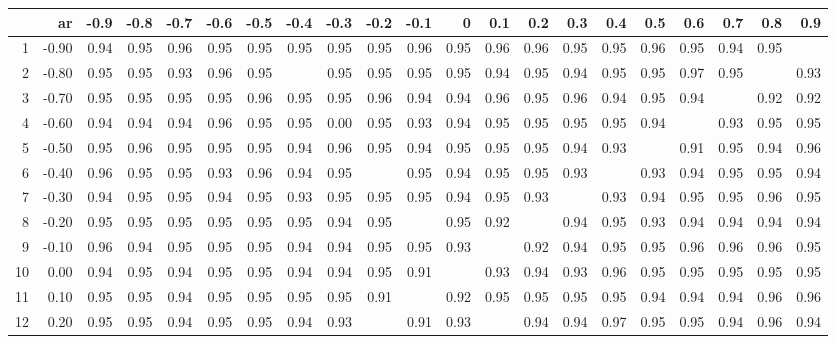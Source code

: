 \begin{table}[ht]
\centering
\begin{tabular}{rrrrrrrrrrrrrrrrrrrrr}
  \hline
 & ar & -0.9 & -0.8 & -0.7 & -0.6 & -0.5 & -0.4 & -0.3 & -0.2 & -0.1 & 0 & 0.1 & 0.2 & 0.3 & 0.4 & 0.5 & 0.6 & 0.7 & 0.8 & 0.9 \\ 
  \hline
1 & -0.90 & 0.94 & 0.95 & 0.96 & 0.95 & 0.95 & 0.95 & 0.95 & 0.95 & 0.96 & 0.95 & 0.96 & 0.96 & 0.95 & 0.95 & 0.96 & 0.95 & 0.94 & 0.95 &  \\ 
  2 & -0.80 & 0.95 & 0.95 & 0.93 & 0.96 & 0.95 &  & 0.95 & 0.95 & 0.95 & 0.95 & 0.94 & 0.95 & 0.94 & 0.95 & 0.95 & 0.97 & 0.95 &  & 0.93 \\ 
  3 & -0.70 & 0.95 & 0.95 & 0.95 & 0.95 & 0.96 & 0.95 & 0.95 & 0.96 & 0.94 & 0.94 & 0.96 & 0.95 & 0.96 & 0.94 & 0.95 & 0.94 &  & 0.92 & 0.92 \\ 
  4 & -0.60 & 0.94 & 0.94 & 0.94 & 0.96 & 0.95 & 0.95 & 0.00 & 0.95 & 0.93 & 0.94 & 0.95 & 0.95 & 0.95 & 0.95 & 0.94 &  & 0.93 & 0.95 & 0.95 \\ 
  5 & -0.50 & 0.95 & 0.96 & 0.95 & 0.95 & 0.95 & 0.94 & 0.96 & 0.95 & 0.94 & 0.95 & 0.95 & 0.95 & 0.94 & 0.93 &  & 0.91 & 0.95 & 0.94 & 0.96 \\ 
  6 & -0.40 & 0.96 & 0.95 & 0.95 & 0.93 & 0.96 & 0.94 & 0.95 &  & 0.95 & 0.94 & 0.95 & 0.95 & 0.93 &  & 0.93 & 0.94 & 0.95 & 0.95 & 0.94 \\ 
  7 & -0.30 & 0.94 & 0.95 & 0.95 & 0.94 & 0.95 & 0.93 & 0.95 & 0.95 & 0.95 & 0.94 & 0.95 & 0.93 &  & 0.93 & 0.94 & 0.95 & 0.95 & 0.96 & 0.95 \\ 
  8 & -0.20 & 0.95 & 0.95 & 0.95 & 0.95 & 0.95 & 0.95 & 0.94 & 0.95 &  & 0.95 & 0.92 &  & 0.94 & 0.95 & 0.93 & 0.94 & 0.94 & 0.94 & 0.94 \\ 
  9 & -0.10 & 0.96 & 0.94 & 0.95 & 0.95 & 0.95 & 0.94 & 0.94 & 0.95 & 0.95 & 0.93 &  & 0.92 & 0.94 & 0.95 & 0.95 & 0.96 & 0.96 & 0.96 & 0.95 \\ 
  10 & 0.00 & 0.94 & 0.95 & 0.94 & 0.95 & 0.95 & 0.94 & 0.94 & 0.95 & 0.91 &  & 0.93 & 0.94 & 0.93 & 0.96 & 0.95 & 0.95 & 0.95 & 0.95 & 0.95 \\ 
  11 & 0.10 & 0.95 & 0.95 & 0.94 & 0.95 & 0.95 & 0.95 & 0.95 & 0.91 &  & 0.92 & 0.95 & 0.95 & 0.95 & 0.95 & 0.94 & 0.94 & 0.94 & 0.96 & 0.96 \\ 
  12 & 0.20 & 0.95 & 0.95 & 0.94 & 0.95 & 0.95 & 0.94 & 0.93 &  & 0.91 & 0.93 &  & 0.94 & 0.94 & 0.97 & 0.95 & 0.95 & 0.94 & 0.96 & 0.94 \\ 

\end{tabular}
\end{table}
